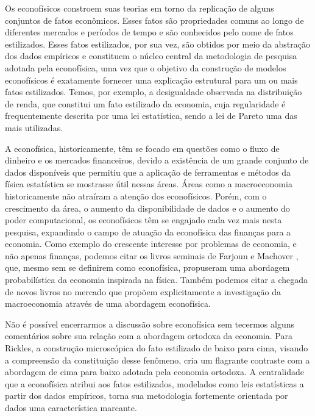 Os econofísicos constroem suas teorias em torno da replicação de alguns conjuntos de fatos econômicos. Esses fatos são propriedades comuns ao longo de diferentes mercados e períodos de tempo e são conhecidos pelo nome de fatos estilizados. Esses fatos estilizados, por sua vez, são obtidos por meio da abstração dos dados empíricos e constituem o núcleo central da metodologia de pesquisa adotada pela econofísica, uma vez que o objetivo da construção de modelos econofísicos é exatamente fornecer uma explicação estrutural para um ou mais fatos estilizados.  Temos, por exemplo, a desigualdade observada na distribuição de renda, que constitui um fato estilizado da economia, cuja regularidade é frequentemente descrita por uma lei estatística, sendo a lei de Pareto uma das mais utilizadas.

A econofísica, historicamente, têm se focado em questões como o fluxo de dinheiro e os mercados financeiros, devido  a existência de um grande conjunto de dados disponíveis que permitiu que a aplicação de ferramentas e métodos da física estatística se mostrasse útil nessas áreas.  Áreas como a macroeconomia  historicamente não atraíram a atenção dos econofísicos. Porém, com o crescimento da área, o aumento da disponibilidade de dados e o aumento do poder computacional, os econofísicos têm se engajado cada vez mais nesta pesquisa, expandindo o campo de atuação da econofísica das finanças para a economia. Como exemplo do crescente interesse por problemas  de economia, e não apenas finanças, podemos citar os livros seminais  de Farjoun e Machover \cite{farjoun2020laws,farjoun2022labor}, que, mesmo sem se definirem como econofísica, propuseram uma abordagem probabilística da economia inspirada na física. Também podemos citar a chegada de novos livros no mercado que propõem explicitamente a investigação da macroeconomia através de uma abordagem econofísica\cite{aoyama2017macro}.


Não é possível encerrarmos a discussão sobre econofísica sem tecermos alguns comentários sobre sua relação com a abordagem ortodoxa da economia.  Para Rickles, a construção microscópica do fato estilizado de baixo para cima, visando a compreensão da constituição desse fenômeno, cria um flagrante contraste com a abordagem de cima para baixo adotada pela economia ortodoxa\cite{rickles2023econophysics}.  A centralidade que a econofísica atribui aos fatos estilizados, modelados como leis estatísticas a partir dos dados empíricos, torna sua metodologia fortemente orientada por dados uma característica marcante.

